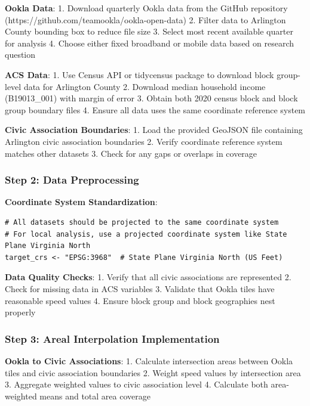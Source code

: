 \documentclass[
  letterpaper,
  DIV=11,
  numbers=noendperiod]{scrartcl}
\begin{document}
\textbf{Ookla Data}: 1. Download quarterly Ookla data from the GitHub
repository (https://github.com/teamookla/ookla-open-data) 2. Filter data
to Arlington County bounding box to reduce file size 3. Select most
recent available quarter for analysis 4. Choose either fixed broadband
or mobile data based on research question

\textbf{ACS Data}: 1. Use Census API or tidycensus package to download
block group-level data for Arlington County 2. Download median household
income (B19013\_001) with margin of error 3. Obtain both 2020 census
block and block group boundary files 4. Ensure all data uses the same
coordinate reference system

\textbf{Civic Association Boundaries}: 1. Load the provided GeoJSON file
containing Arlington civic association boundaries 2. Verify coordinate
reference system matches other datasets 3. Check for any gaps or
overlaps in coverage

\subsubsection{Step 2: Data
Preprocessing}\label{step-2-data-preprocessing}

\textbf{Coordinate System Standardization}:

\begin{verbatim}
# All datasets should be projected to the same coordinate system
# For local analysis, use a projected coordinate system like State Plane Virginia North
target_crs <- "EPSG:3968"  # State Plane Virginia North (US Feet)
\end{verbatim}

\textbf{Data Quality Checks}: 1. Verify that all civic associations are
represented 2. Check for missing data in ACS variables 3. Validate that
Ookla tiles have reasonable speed values 4. Ensure block group and block
geographies nest properly

\subsubsection{Step 3: Areal Interpolation
Implementation}\label{step-3-areal-interpolation-implementation}

\textbf{Ookla to Civic Associations}: 1. Calculate intersection areas
between Ookla tiles and civic association boundaries 2. Weight speed
values by intersection area 3. Aggregate weighted values to civic
association level 4. Calculate both area-weighted means and total area
coverage
\end{document}
